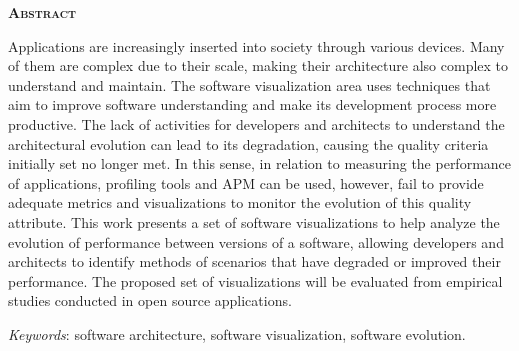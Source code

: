 \begin{center}
	{\Large{\textbf{\mscThesisEnglishTitle}}}
\end{center}

\vspace{1cm}


\vspace{1cm}

\begin{center}
	\Large{\textsc{\textbf{Abstract}}}
\end{center}

\noindent Applications are increasingly inserted into society through various devices. Many of them are complex due to their scale, making their architecture also complex to understand and maintain. The software visualization area uses techniques that aim to improve software understanding and make its development process more productive. The lack of activities for developers and architects to understand the architectural evolution can lead to its degradation, causing the quality criteria initially set no longer met. In this sense, in relation to measuring the performance of applications, profiling tools and APM can be used, however, fail to provide adequate metrics and visualizations to monitor the evolution of this quality attribute. This work presents a set of software visualizations to help analyze the evolution of performance between versions of a software, allowing developers and architects to identify methods of scenarios that have degraded or improved their performance. The proposed set of visualizations will be evaluated from empirical studies conducted in open source applications.

\noindent\textit{Keywords}: software architecture, software visualization, software evolution.